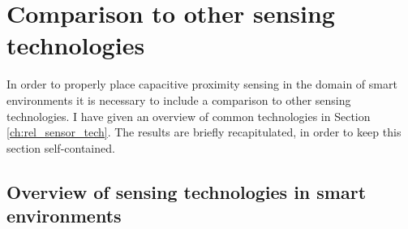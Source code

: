 \section{Comparison to other sensing technologies}
\label{ch:sens_compare}
In order to properly place capacitive proximity sensing in the domain of smart environments it is necessary to include a comparison to other sensing technologies. I have given an overview of common technologies in Section \ref{ch:rel_sensor_tech}. The results are briefly recapitulated, in order to keep this section self-contained. 

\subsection{Overview of sensing technologies in smart environments}
